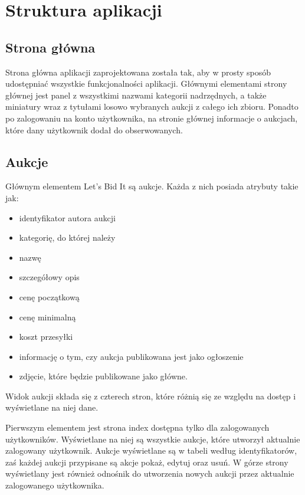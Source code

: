 \documentclass[brudnopis]{xmgr}
\begin{document}
\newpage

\section{Struktura aplikacji}

\subsection{Strona główna}

Strona główna aplikacji zaprojektowana została tak, aby w prosty sposób udostępniać wszystkie funkcjonalności aplikacji. Głównymi elementami strony głównej jest panel z wszystkimi nazwami kategorii nadrzędnych, a także miniatury wraz z tytułami losowo wybranych aukcji z całego ich zbioru. Ponadto po zalogowaniu na konto użytkownika, na stronie głównej informacje o aukcjach, które dany użytkownik dodał do obserwowanych.

\subsection{Aukcje}

Głównym elementem Let's Bid It są aukcje. Każda z nich posiada atrybuty takie jak:
\begin{itemize}

\item identyfikator autora aukcji
\item kategorię, do której należy
\item nazwę
\item szczegółowy opis
\item cenę początkową
\item cenę minimalną
\item koszt przesyłki
\item informację o tym, czy aukcja publikowana jest jako ogłoszenie
\item zdjęcie, które będzie publikowane jako główne.

\end{itemize}

Widok aukcji składa się z czterech stron, które różnią się ze względu na dostęp i wyświetlane na niej dane.

Pierwszym elementem jest strona index dostępna tylko dla zalogowanych użytkowników. Wyświetlane na niej są wszystkie aukcje, które utworzył aktualnie zalogowany użytkownik. Aukcje wyświetlane są w tabeli według identyfikatorów, zaś każdej aukcji przypisane są akcje pokaż, edytuj oraz usuń. W górze strony wyświetlany jest również odnośnik do utworzenia nowych aukcji przez aktualnie zalogowanego użytkownika.
\end{document}
